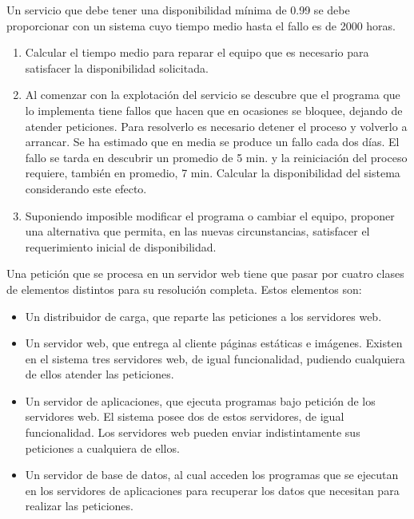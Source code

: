 \TheSolution



\Problem[6]
Un  servicio que debe tener una disponibilidad mínima de 0.99
se debe proporcionar con un sistema cuyo tiempo medio hasta el fallo es de
 2000 horas.
\begin{enumerate}
	\item Calcular el tiempo medio para reparar el equipo que es necesario para satisfacer la disponibilidad solicitada.
	\item Al comenzar con la explotación del servicio se descubre que el
programa que lo implementa tiene fallos que hacen que en ocasiones se
bloquee, dejando de atender peticiones. Para resolverlo es necesario
detener el proceso y volverlo a arrancar. Se ha estimado que en media se
 produce un fallo cada dos días. El fallo se tarda en descubrir un
promedio de 5 min. y la reiniciación del proceso requiere, también en
promedio, 7 min. Calcular la disponibilidad del sistema considerando este
 efecto.
	\item Suponiendo imposible modificar el programa o cambiar el equipo,
proponer una alternativa que permita, en las nuevas circunstancias,
satisfacer el requerimiento inicial de disponibilidad.
\end{enumerate}

\TheSolution



\Problem[7]
Una petición que se procesa en un servidor web tiene que pasar por
cuatro clases de elementos distintos para su resolución completa. Estos
elementos son:
  \begin{itemize}
    	\item Un distribuidor de carga, que reparte las peticiones a los servidores web.
    	\item Un servidor web, que entrega al cliente páginas estáticas e
imágenes. Existen en el sistema tres servidores web, de igual
funcionalidad, pudiendo cualquiera de ellos atender las peticiones.
    	\item Un servidor de aplicaciones, que ejecuta programas bajo petición
 de los servidores web. El sistema posee dos de estos servidores, de
igual funcionalidad. Los servidores web pueden enviar indistintamente
sus peticiones a cualquiera de ellos.
    	\item Un servidor de base de datos, al cual acceden los programas que
se ejecutan en los servidores de aplicaciones para recuperar los datos
que necesitan para realizar las peticiones.
  \end{itemize}


